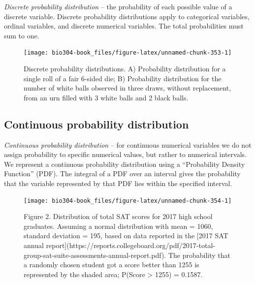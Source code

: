\documentclass[]{book}
\theoremstyle{definition}
\theoremstyle{definition}
\theoremstyle{definition}
\theoremstyle{remark}
\begin{document}
\emph{Discrete probability distribution} -- the probability of each
possible value of a discrete variable. Discrete probability
distributions apply to categorical variables, ordinal variables, and
discrete numerical variables. The total probabilities must sum to one.

\begin{figure}

{\centering \texttt{[image: bio304-book\_files/figure-latex/unnamed-chunk-353-1]} 

}

\caption{Discrete probability distributions. A) Probability distribution for a single roll of a fair 6-sided die; B) Probability distribution for the number of white balls observed in three draws, without replacement, from an urn filled with 3 white balls and 2 black balls.}\label{fig:unnamed-chunk-353}
\end{figure}

\hypertarget{continuous-probability-distribution}{%
\subsection{Continuous probability
distribution}\label{continuous-probability-distribution}}

\emph{Continuous probability distribution} -- for continuous numerical
variables we do not assign probability to specific numerical values, but
rather to numerical intervals. We represent a continuous probability
distribution using a ``Probability Density Function'' (PDF). The
integral of a PDF over an interval gives the probability that the
variable represented by that PDF lies within the specified interval.

\begin{figure}

{\centering \texttt{[image: bio304-book\_files/figure-latex/unnamed-chunk-354-1]} 

}

\caption{Figure 2. Distribution of total SAT scores for 2017 high school graduates. Assuming a normal distribution with mean = 1060, standard deviation = 195, based on data  reported in the [2017 SAT annual report](https://reports.collegeboard.org/pdf/2017-total-group-sat-suite-assessments-annual-report.pdf). The probability that a randomly chosen student got a score better than 1255 is represented by the shaded area; P(Score > 1255) = 0.1587.}\label{fig:unnamed-chunk-354}
\end{figure}
\end{document}
